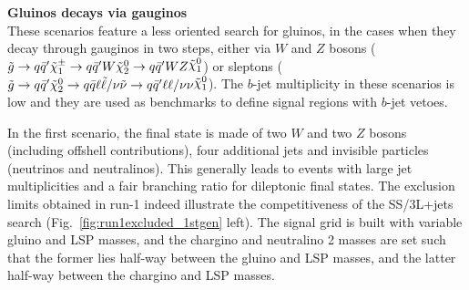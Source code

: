 

\par{\bf Gluinos decays via gauginos\\}
These scenarios feature a less oriented search for gluinos, in the cases when they decay through gauginos in two steps, 
either via $W$ and $Z$ bosons ($\gluino\to q\bar{q}'\chargino\to q\bar{q}'W\tilde{\chi}_{2}^{0}\to q\bar{q}'WZ\ninoone$) 
or sleptons ($\gluino\to q\bar{q}'\tilde{\chi}_{2}^{0}  \to  q\bar{q}\ell\tilde\ell/\nu\tilde\nu  \to  q\bar{q}'\ell\ell/\nu\nu\ninoone$). 
The $b$-jet multiplicity in these scenarios is low and they are used as benchmarks to define signal regions with $b$-jet vetoes. 

In the first scenario, the final state is made of two $W$ and two $Z$ bosons (including offshell contributions), 
four additional jets and invisible particles (neutrinos and neutralinos). 
This generally leads to events with large jet multiplicities and a fair branching ratio for dileptonic final states. 
The exclusion limits obtained in run-1 indeed illustrate the competitiveness of the SS/3L+jets search (Fig.~\ref{fig:run1excluded_1stgen} left). 
The signal grid is built with variable gluino and LSP masses, 
and the chargino and neutralino 2 masses are set such that the former lies half-way between the gluino and LSP masses, 
and the latter half-way between the chargino and LSP masses. 

